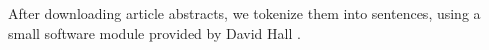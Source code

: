 After downloading article abstracts, we tokenize them into sentences, using a small software
module provided by David Hall \cite{davidhall2015}.
